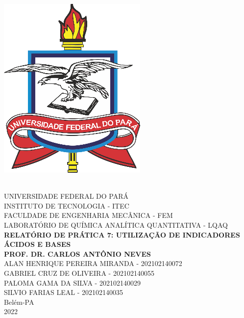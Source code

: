 \documentclass[a4paper, 11pt]{article}
\begin{document}
\thispagestyle{empty}
    \begin{center}
        \parbox{3cm}{\includegraphics[scale=1]{pictures/logo_ufpa}}\\
        \vspace{1cm}
        \Large \uppercase{Universidade Federal do Pará}\\
        \Large \uppercase{Instituto de Tecnologia - ITEC}\\
        \vspace{3cm}
        \Large \uppercase{Faculdade de Engenharia Mecânica - FEM}\\
        \Large \uppercase{Laboratório de Química Analítica Quantitativa - LQAQ}\\
        \vspace{3cm}
        \Large \textbf{\uppercase {Relatório de Prática 7: Utilização de Indicadores Ácidos e Bases}} \\
        \Large \textbf{\uppercase {PROF. DR. Carlos Antônio Neves}} \\
        \vspace{3cm}
        \Large \uppercase {Alan Henrique Pereira Miranda - 202102140072}\\
        \Large \uppercase {Gabriel Cruz de Oliveira - 202102140055}\\
        \Large \uppercase {Paloma Gama da Silva - 202102140029}\\
        \Large \uppercase {Silvio Farias Leal - 202102140035}\\
        \vspace{1cm}
        \Large {Belém-PA \\ 2022}

    \end{center}
\end{document}
